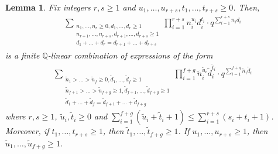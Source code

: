 \documentclass[12pt, reqno]{amsart}
\newtheorem{lemma}[theorem]{Lemma}
\theoremstyle{definition}
\theoremstyle{remark}
\numberwithin{equation}{section}
\newcommand{\Q}{ \mathbb Q }
\newcommand{\w}{\tilde}
\numberwithin{equation}{section}
\begin{document}
\begin{lemma}  \label{finite_redu} 
Fix integers $r, s \ge 1$ and $u_1, \ldots, u_{r+s}, 
t_1, \ldots, t_{r+s} \ge 0$. Then, 
\begin{eqnarray}  \label{finite_redu.01}
\sum_{\substack{n_1, \ldots, n_r \ge 0, d_1, \ldots, d_r \ge 1\\
    n_{r+1}, \ldots, n_{r+s}, d_{r+1}, \ldots, d_{r+s} \ge 1\\
    d_1+ \ldots + d_r = d_{r+1} + \ldots + d_{r+s}}}
  \prod_{i=1}^{r+s} n_i^{u_i}d_i^{t_i} \cdot q^{\sum_{i=1}^{r+s} n_i d_i}
\end{eqnarray}
is a finite $\Q$-linear combination of expressions of the form
\begin{eqnarray}  \label{finite_redu.02}
\sum_{\substack{\w n_1 > \ldots > \w n_f \ge 0, 
    \w d_1, \ldots, \w d_f \ge 1\\
    \w n_{f+1}> \ldots > \w n_{f+g} \ge 1, 
    \w d_{f+1}, \ldots, \w d_{f+g} \ge 1\\
    \w d_1+ \ldots + \w d_f = \w d_{f+1} + \ldots + \w d_{f+g}}}
    \prod_{i=1}^{f+g} \w n_i^{\w u_i} \w d_i^{\w t_i} 
    \cdot q^{\sum_{i=1}^{f+g} \w n_i \w d_i}
\end{eqnarray}
where $r, s \ge 1$, $\w u_i, \w t_i \ge 0$ and 
$\sum_{i=1}^{f+g} (\w u_i + \w t_i + 1)  
\le \sum_{i=1}^{r+s} (s_i+t_i + 1)$. Moreover,
if $t_1, \ldots, t_{r+s} \ge 1$, then $\w t_1, \ldots, \w t_{f+g} \ge 1$. 
If $u_1, \ldots, u_{r+s} \ge 1$, 
then $\w u_1, \ldots, \w u_{f+g} \ge 1$.
\end{lemma}
\end{document}
